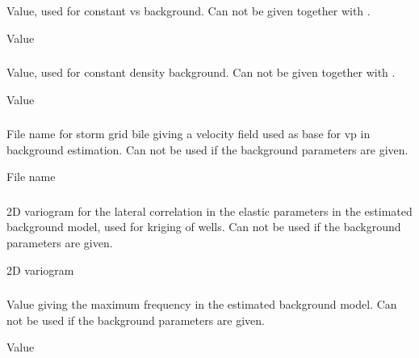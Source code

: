 \subsubsection{}
 \slist
   \item \Description Value, used for constant vs background. Can not be given together with .
   \item \Argument Value
   \item \Default
 \elist

\subsubsection{}
 \slist
   \item \Description Value, used for constant density background. Can not be given together with .
   \item \Argument Value
   \item \Default
 \elist

\subsubsection{}
 \slist
   \item \Description File name for storm grid bile giving a velocity field used as base for vp in background estimation. Can not be used if the background parameters are given.
   \item \Argument File name
   \item \Default
 \elist

\subsubsection{}
 \slist
   \item \Description 2D variogram for the lateral correlation in the elastic parameters in the estimated background model, used for kriging of wells. Can not be used if the background parameters are given.
   \item \Argument 2D variogram
   \item \Default
 \elist

\subsubsection{}
 \slist
   \item \Description Value giving the maximum frequency in the estimated background model. Can not be used if the background parameters are given.
   \item \Argument Value
   \item \Default
 \elist

